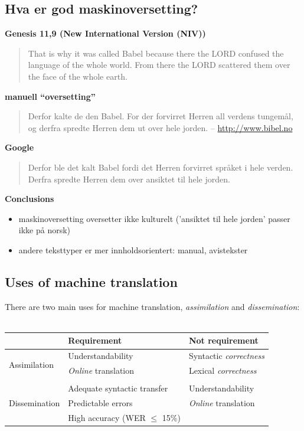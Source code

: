 \documentclass[a4paper,english,12pt]{article}
\begin{document}
\begin{spacing}{1.0}
\subsection{Hva er god maskinoversetting?}

\textbf{Genesis 11,9 (New International Version (NIV))}
\begin{quote}
That is why it was called Babel because there the LORD confused the language of the whole world. From 
there the LORD scattered them over the face of the whole earth.
\end{quote}

\textbf{manuell ``oversetting''}
\begin{quote}
Derfor kalte de den Babel. For der forvirret Herren all verdens tungemål, og derfra spredte Herren dem ut over hele jorden.
-- \url{http://www.bibel.no}
\end{quote}

\textbf{Google}
\begin{quote}
Derfor ble det kalt Babel fordi det Herren forvirret språket i hele verden. Derfra spredte Herren dem over ansiktet til hele jorden.
\end{quote}
 
\textbf{Conclusions} 
\begin{itemize}
\item maskinoversetting oversetter ikke kulturelt ('ansiktet til hele jorden' passer ikke på norsk)
\item andere teksttyper er mer innholdsorientert: manual, avistekster
\end{itemize} 
 

 
\subsection{Uses of machine translation}


There are two main uses for machine translation, \emph{assimilation} and \emph{dissemination}:\\
~\\
\begin{table}
\begin{tabular}{l|l|l}
~  & Requirement & Not requirement\\
\hline
\multirow{3}{*}{Assimilation} & Understandability         & Syntactic \emph{correctness}\\
                              & \emph{Online} translation & Lexical \emph{correctness}\\
                              &                  & \\
\hline
\multirow{3}{*}{Dissemination} & Adequate syntactic transfer & Understandability \\
                               &  Predictable errors   & \emph{Online} translation \\
                               &  High accuracy (WER $\le$ 15\%)    & \\
\hline
\end{tabular}
\end{table}




\end{spacing}
\end{document}
